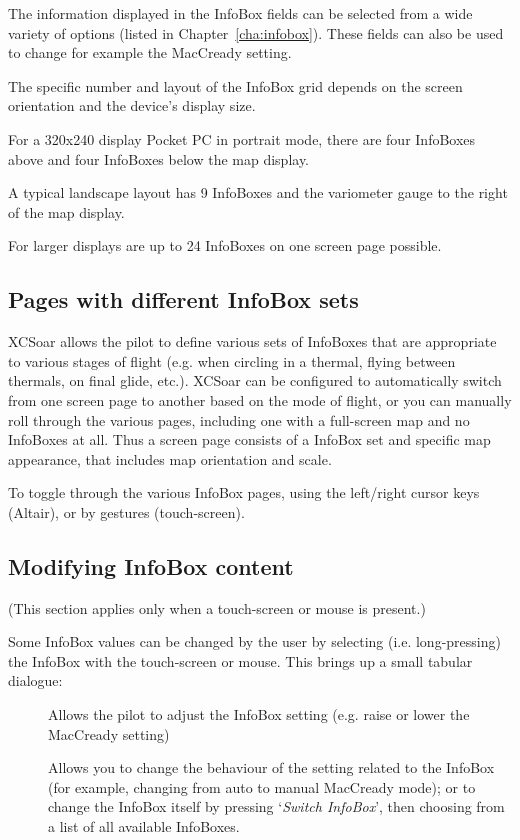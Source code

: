 The information displayed in the InfoBox fields can be selected from a
wide variety of options (listed in Chapter~\ref{cha:infobox}). These
fields can also be used to change for example the MacCready setting.

The specific number and layout of the InfoBox grid depends on the
screen orientation and the device's display size.

For a 320x240 display
Pocket PC in portrait mode, there are four InfoBoxes above and four
InfoBoxes below the map display.

A typical landscape layout has 9 InfoBoxes and the variometer gauge
to the right of the map display.

For larger displays are up to 24 InfoBoxes on one screen page possible.


\subsection*{Pages with different InfoBox sets}

XCSoar allows the pilot to define various sets of InfoBoxes that are
appropriate to various stages of flight (e.g. when circling in a thermal,
flying between thermals, on final glide, etc.). XCSoar can be configured
to automatically switch from one screen page to another based on the mode
of flight, or you can manually roll through the various pages, including
one with a full-screen map and no InfoBoxes at all. Thus a screen page
consists of a InfoBox set and specific map appearance, that includes
map orientation and scale.

To toggle through the various InfoBox pages, using the left/right cursor
keys (Altair), or by gestures (touch-screen).


\subsection*{Modifying InfoBox content}

(This section applies only when a touch-screen or mouse is present.)

Some InfoBox values can be changed by the user by selecting (i.e. long-pressing) the
InfoBox with the touch-screen or mouse.  This brings up a small tabular dialogue:

\begin{description}
\item[]
  Allows the pilot to adjust the InfoBox setting (e.g. raise or lower the
  MacCready setting)

\item[]
  Allows you to change the behaviour of the setting related to the InfoBox
  (for example, changing from auto to manual MacCready mode); or
  to change the InfoBox itself by pressing `{\it Switch InfoBox}', then
  choosing from a list of all available InfoBoxes.

\end{description}

